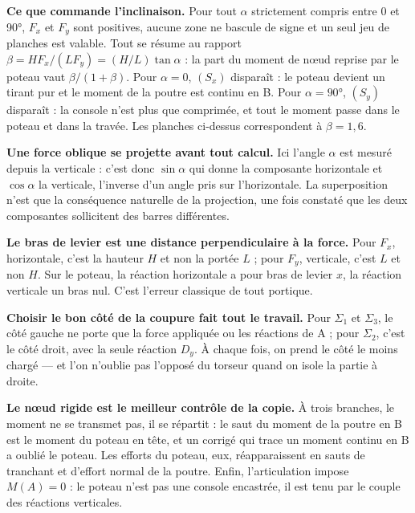 \textbf{Ce que commande l'inclinaison.} Pour tout $\alpha$ strictement compris entre 0 et 90°, $F_x$ et $F_y$ sont positives, aucune zone ne bascule de signe et un seul jeu de planches est valable. Tout se résume au rapport $\beta = HF_x/(LF_y) = (H/L)\tan\alpha$ : la part du moment de nœud reprise par le poteau vaut $\beta/(1+\beta)$. Pour $\alpha = 0$, $(S_x)$ disparaît : le poteau devient un tirant pur et le moment de la poutre est continu en B. Pour $\alpha = 90°$, $(S_y)$ disparaît : la console n'est plus que comprimée, et tout le moment passe dans le poteau et dans la travée. Les planches ci-dessus correspondent à $\beta = 1{,}6$.


\textbf{Une force oblique se projette avant tout calcul.} Ici l'angle $\alpha$ est mesuré depuis la verticale : c'est donc $\sin\alpha$ qui donne la composante horizontale et $\cos\alpha$ la verticale, l'inverse d'un angle pris sur l'horizontale. La superposition n'est que la conséquence naturelle de la projection, une fois constaté que les deux composantes sollicitent des barres différentes.

\textbf{Le bras de levier est une distance perpendiculaire à la force.} Pour $F_x$, horizontale, c'est la hauteur $H$ et non la portée $L$ ; pour $F_y$, verticale, c'est $L$ et non $H$. Sur le poteau, la réaction horizontale a pour bras de levier $x$, la réaction verticale un bras nul. C'est l'erreur classique de tout portique.

\textbf{Choisir le bon côté de la coupure fait tout le travail.} Pour $\Sigma_1$ et $\Sigma_3$, le côté gauche ne porte que la force appliquée ou les réactions de A ; pour $\Sigma_2$, c'est le côté droit, avec la seule réaction $D_y$. À chaque fois, on prend le côté le moins chargé — et l'on n'oublie pas l'opposé du torseur quand on isole la partie à droite.

\textbf{Le nœud rigide est le meilleur contrôle de la copie.} À trois branches, le moment ne se transmet pas, il se répartit : le saut du moment de la poutre en B est le moment du poteau en tête, et un corrigé qui trace un moment continu en B a oublié le poteau. Les efforts du poteau, eux, réapparaissent en sauts de tranchant et d'effort normal de la poutre. Enfin, l'articulation impose $M(A) = 0$ : le poteau n'est pas une console encastrée, il est tenu par le couple des réactions verticales.


